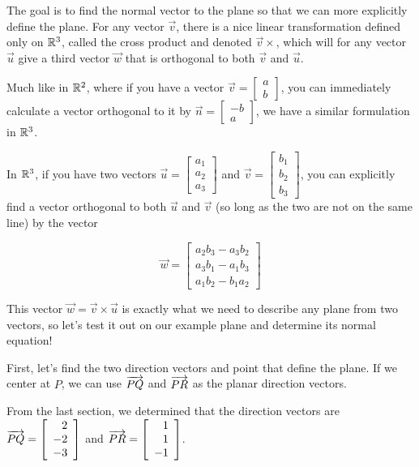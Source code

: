 \documentclass{ximera}
\begin{document}
  \begin{solution}
    The goal is to find the normal vector to the plane so that we can more explicitly define the plane. For any vector $\vec{v}$, there is a nice linear transformation defined only on $\RR^3$, called the cross product and denoted $\vec{v}\times$, which will for any vector $\vec{u}$ give a third vector $\vec{w}$ that is orthogonal to both $\vec{v}$ and $\vec{u}$.

    Much like in $\RR^2$, where if you have a vector $\vec{v}=\begin{bmatrix}
      a\\b
    \end{bmatrix}$, you can immediately calculate a vector orthogonal to it by $\vec{n}=\begin{bmatrix}
      -b\\a
    \end{bmatrix}$, we have a similar formulation in $\RR^3$.

    In $\RR^3$, if you have two vectors $\vec{u}=\begin{bmatrix}
      a_1\\a_2\\a_3
    \end{bmatrix}$ and $\vec{v}=\begin{bmatrix}
      b_1\\b_2\\b_3
    \end{bmatrix}$, you can explicitly find a vector orthogonal to both $\vec{u}$ and $\vec{v}$ (so long as the two are not on the same line) by the vector

    $$\vec{w}=\begin{bmatrix}
      a_2b_3-a_3b_2\\a_3b_1-a_1b_3\\a_1b_2-b_1a_2
    \end{bmatrix}$$

    This vector $\vec{w}=\vec{v}\times\vec{u}$ is exactly what we need to describe any plane from two vectors, so let's test it out on our example plane and determine its normal equation!

    First, let's find the two direction vectors and point that define the plane. If we center at $P$, we can use  $\longvect{PQ}$ and $\longvect{PR}$ as the planar direction vectors. 

    From the last section, we determined that the direction vectors are $\longvect{PQ}=\startmat{r} 2 \\ -2 \\ -3 \stopmat$ and $\longvect{PR}=\startmat{r} 1 \\ 1 \\ -1 \stopmat$.
    

\end{solution}
\end{document}
